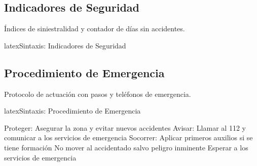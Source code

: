 \subsection{Indicadores de Seguridad}
\label{subsec:indicadores-seguridad}

Índices de siniestralidad y contador de días sin accidentes.

\begin{codigosimple}{latex}{Sintaxis: Indicadores de Seguridad}
\end{codigosimple}

\noindent
{}
\hfill
{}
\hfill
{}
\hfill
{}

\subsection{Procedimiento de Emergencia}
\label{subsec:emergencia}

Protocolo de actuación con pasos y teléfonos de emergencia.

\begin{codigosimple}{latex}{Sintaxis: Procedimiento de Emergencia}
\begin{emergencyprocedure}[Título]
\end{emergencyprocedure}
\end{codigosimple}

\begin{emergencyprocedure}
  \begin{steplist}
    \step Proteger: Asegurar la zona y evitar nuevos accidentes
    \step Avisar: Llamar al 112 y comunicar a los servicios de emergencia
    \step Socorrer: Aplicar primeros auxilios si se tiene formación
    \step No mover al accidentado salvo peligro inminente
    \step Esperar a los servicios de emergencia
  \end{steplist}

  \vspace{0.5em}
  \\
  \\
\end{emergencyprocedure}

